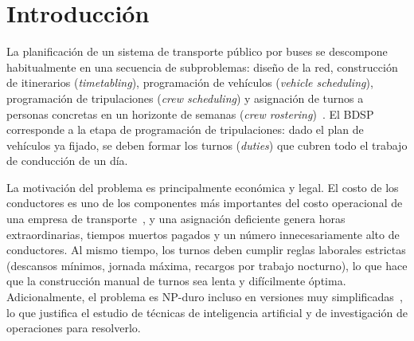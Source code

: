 \documentclass[letter, 10pt]{article}
\begin{document}
\begin{abstract}
El \emph{Bus Driver Scheduling Problem} (BDSP) consiste en construir los turnos diarios de trabajo de los conductores de una empresa de transporte público, de modo que cada tramo de recorrido de los buses sea cubierto exactamente por un conductor, respetando la legislación laboral y los convenios colectivos. Se trata de un problema de optimización combinatoria NP-duro, cuyo costo impacta directamente en la operación de las empresas, dado que la mano de obra constituye una de sus principales partidas de gasto. En este documento se define el problema y la variante a estudiar, cuyo objetivo es minimizar el tiempo pagado total bajo reglas de descanso, sobretiempo, trabajo nocturno, tiempo mínimo pagado y duración máxima del turno. Se revisa la literatura desde los modelos clásicos de partición y cobertura de conjuntos hasta las metaheurísticas y los enfoques híbridos recientes, y se propone un modelo de programación lineal entera mixta que captura todas las reglas de la variante estudiada.
\end{abstract}

\section{Introducci\'on}
La planificación de un sistema de transporte público por buses se descompone habitualmente en una secuencia de subproblemas: diseño de la red, construcción de itinerarios (\emph{timetabling}), programación de vehículos (\emph{vehicle scheduling}), programación de tripulaciones (\emph{crew scheduling}) y asignación de turnos a personas concretas en un horizonte de semanas (\emph{crew rostering})~\cite{IbarraRojas2015,DeLeone2011a}. El BDSP corresponde a la etapa de programación de tripulaciones: dado el plan de vehículos ya fijado, se deben formar los turnos (\emph{duties}) que cubren todo el trabajo de conducción de un día.

La motivación del problema es principalmente económica y legal. El costo de los conductores es uno de los componentes más importantes del costo operacional de una empresa de transporte~\cite{WrenRousseau1995}, y una asignación deficiente genera horas extraordinarias, tiempos muertos pagados y un número innecesariamente alto de conductores. Al mismo tiempo, los turnos deben cumplir reglas laborales estrictas (descansos mínimos, jornada máxima, recargos por trabajo nocturno), lo que hace que la construcción manual de turnos sea lenta y difícilmente óptima. Adicionalmente, el problema es NP-duro incluso en versiones muy simplificadas~\cite{Fischetti1987,Fischetti1989}, lo que justifica el estudio de técnicas de inteligencia artificial y de investigación de operaciones para resolverlo.
\end{document}
